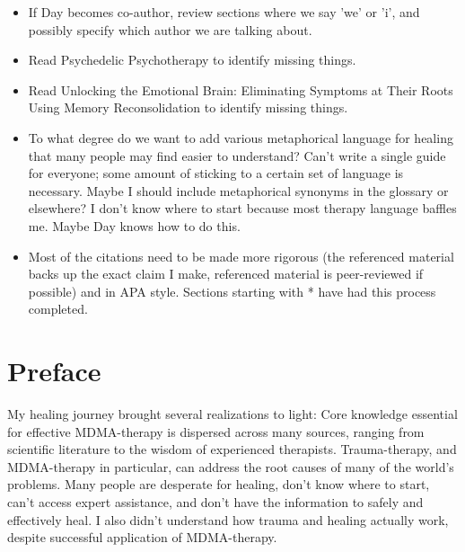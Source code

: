 \documentclass[12pt,letterpaper]{article}
\begin{document}
\begin{itemize}
    \item If Day becomes co-author, review sections where we say 'we' or 'i', and possibly specify which author we are talking about.
    \item Read Psychedelic Psychotherapy to identify missing things.
    \item Read Unlocking the Emotional Brain: Eliminating Symptoms at Their Roots Using Memory Reconsolidation to identify missing things.
    \item To what degree do we want to add various metaphorical language for healing that many people may find easier to understand? Can't write a single guide for everyone; some amount of sticking to a certain set of language is necessary. Maybe I should include metaphorical synonyms in the glossary or elsewhere? I don't know where to start because most therapy language baffles me. Maybe Day knows how to do this.
    \item Most of the citations need to be made more rigorous (the referenced material backs up the exact claim I make, referenced material is peer-reviewed if possible) and in APA style. Sections starting with * have had this process completed.
\end{itemize}
\section*{Preface}

My healing journey brought several realizations to light: Core knowledge essential for effective MDMA-therapy is dispersed across many sources, ranging from scientific literature to the wisdom of experienced therapists. Trauma-therapy, and MDMA-therapy in particular, can address the root causes of many of the world's problems. Many people are desperate for healing, don't know where to start, can't access expert assistance, and don't have the information to safely and effectively heal. I also didn't understand how trauma and healing actually work, despite successful application of MDMA-therapy. 
\end{document}
